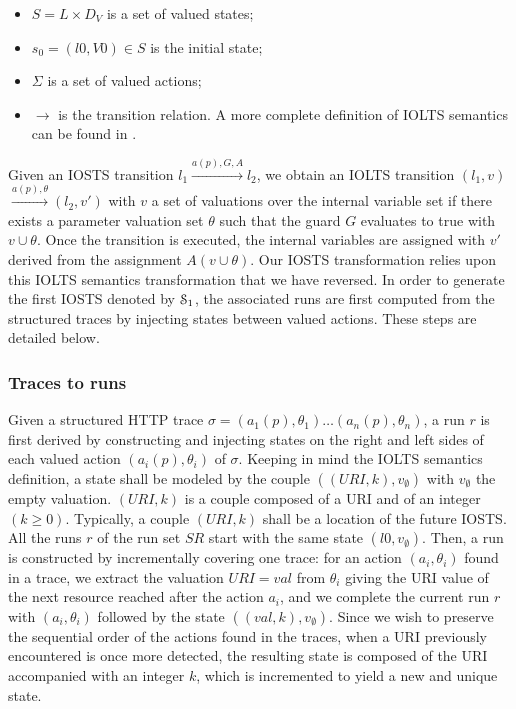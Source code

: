 \begin{itemize}
    \item $S = L \times D_V$ is a set of valued states;

    \item $s_0=(l0,V0) \in S$ is the initial state;

    \item $\Sigma$ is a set of valued actions;

    \item $\rightarrow$ is the transition relation. A more
        complete definition of IOLTS semantics can be found in
        \cite{FTW05}.
\end{itemize}

Given an IOSTS transition $l_1 \xrightarrow{a(p),G,A}l_2$, we
obtain an IOLTS transition $(l_1,v)$ $\xrightarrow{a(p),\theta}
(l_2,v')$ with $v$ a set of valuations over the internal variable
set if there exists a parameter valuation set $\theta$ such that
the guard $G$ evaluates to true with $v \cup \theta$. Once the
transition is executed, the internal variables are assigned with
$v'$ derived from the assignment $A(v \cup \theta)$.
Our IOSTS transformation relies upon this IOLTS semantics
transformation that we have reversed.  In order to generate the
first IOSTS denoted by $\EuScript{S}_1$, the associated runs are
first computed from the structured traces by injecting states
between valued actions. These steps are detailed below.

\subsubsection{Traces to runs}

Given a structured HTTP trace $\sigma = (a_1(p),\theta_1) \dots
(a_n(p),\theta_n)$, a run $r$ is first derived by constructing
and injecting states on the right and left sides of
each valued action $(a_i(p),\theta_i)$ of $\sigma$. Keeping in
mind the IOLTS semantics definition, a state shall be modeled by
the couple $((URI,k),v_\emptyset)$ with $v_\emptyset$ the empty
valuation.  $(URI,k)$ is a couple composed of a URI and of an
integer $(k \geq 0)$. Typically, a couple $(URI,k)$ shall be a
location of the future IOSTS. All the runs $r$ of the run set
$SR$ start with the same state $(l0,v_\emptyset)$. Then, a run is
constructed by incrementally covering one trace: for an action
$(a_i,\theta_i)$ found in a trace, we extract the valuation
$URI=val$ from $\theta_i$ giving the URI value of the next
resource reached after the action $a_i$, and we complete the
current run $r$ with $(a_i,\theta_i)$ followed by the state
$((val,k),v_\emptyset)$.  Since we wish to preserve the
sequential order of the actions found in the traces, when a URI
previously encountered is once more detected, the resulting state
is composed of the URI accompanied with an integer $k$, which is
incremented to yield a new and unique state.

